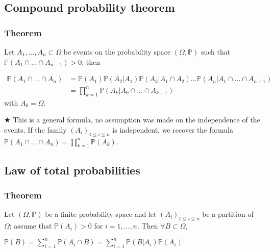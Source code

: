         \subsection{Compound probability theorem}
            \subsubsection{Theorem}
                Let $A_1,...,A_n \subset \Omega$ be events on the probability space $(\Omega, \mathbb{P})$ such that \\ $\mathbb{P}(A_1 \cap ... \cap A_{n-1}) > 0$; then

                \begin{align*}
                    \mathbb{P}(A_1 \cap ... \cap A_n) & = \mathbb{P}(A_1)\mathbb{P}(A_2|A_1)\mathbb{P}(A_3|A_1\cap A_2)...\mathbb{P}(A_n|A_1\cap ... \cap A_{n-1}) \\
                    &= \prod_{k=1}^n \mathbb{P}(A_k|A_0\cap...\cap A_{k-1})
                \end{align*} with $A_0=\Omega$.

            \vspace{5pt}

            $\bigstar$ This is a general formula, no assumption was made on the independence of the events. If the family $(A_i)_{1\leq i \leq n}$ is independent, we recover the formula $\mathbb{P}(A_1\cap...\cap A_n) = \displaystyle\prod_{k=1}^n \mathbb{P}(A_k)$.

            \subsection{Law of total probabilities}
                \subsubsection{Theorem}
                    Let $(\Omega, \mathbb{P})$ be a finite probability space and let $(A_i)_{1\leq i \leq n}$ be a partition of $\Omega$; assume that $\mathbb{P}(A_i) > 0$ for $i=1,...,n$. Then $\forall B \subset \Omega$,

                    \vspace{5pt}

                    \centerline{$\mathbb{P}(B) = \displaystyle\sum_{i=1}^n\mathbb{P}(A_i\cap B) = \sum_{i=1}^n\mathbb{P}(B|A_i)\mathbb{P}(A_i)$}
